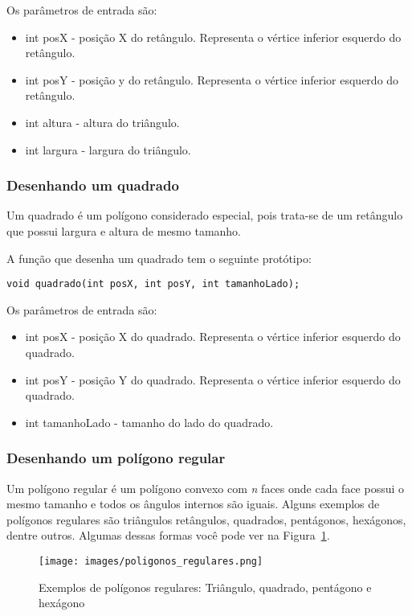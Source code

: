 \documentclass[12pt, %
openright,
oneside, %
a4paper,    %
brazil]{facom-ufu-abntex2}
\begin{document}
Os parâmetros de entrada são:

\begin{itemize}
    \item int posX - posição X do retângulo. Representa o vértice inferior esquerdo do retângulo.
    \item int posY - posição y do retângulo. Representa o vértice inferior esquerdo do retângulo.
    \item int altura - altura do triângulo.
    \item int largura - largura do triângulo.
\end{itemize}

\subsubsection{Desenhando um quadrado}
Um quadrado é um polígono considerado especial, pois trata-se de um retângulo que possui largura e altura de mesmo tamanho.

A função que desenha um quadrado tem o seguinte protótipo:

\begin{verbatim}
void quadrado(int posX, int posY, int tamanhoLado);
\end{verbatim}

Os parâmetros de entrada são:

\begin{itemize}
    \item int posX - posição X do quadrado. Representa o vértice inferior esquerdo do quadrado.
    \item int posY - posição Y do quadrado. Representa o vértice inferior esquerdo do quadrado.
    \item int tamanhoLado - tamanho do lado do quadrado.
\end{itemize}

\subsubsection{Desenhando um polígono regular}
Um polígono regular é um polígono convexo com \textit{n} faces onde cada face possui o mesmo tamanho e todos os ângulos internos são iguais. Alguns exemplos de polígonos regulares são triângulos retângulos, quadrados, pentágonos, hexágonos, dentre outros. Algumas dessas formas você pode ver na Figura~\ref{fig:poligonos_regulares}.

\begin{figure}[htbp]
  \centering
  \texttt{[image: images/poligonos\_regulares.png]}
  \caption{Exemplos de polígonos regulares: Triângulo, quadrado, pentágono e hexágono}
  \label{fig:poligonos_regulares}
\end{figure}
\end{document}
